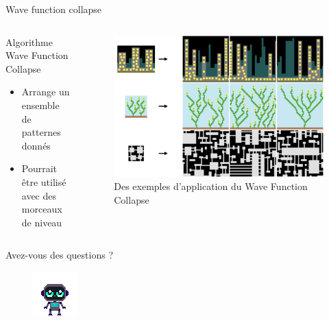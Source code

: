 \documentclass{beamer}
\begin{document}
{\begin{frame}{Wave function collapse}
    \begin{columns}
        \begin{block}{Algorithme Wave Function Collapse}
            \begin{itemize}
                \item[\bullet] Arrange un ensemble de patternes donnés
                \item[\bullet] Pourrait être utilisé avec des morceaux de niveau
            \end{itemize}
        \end{block}
        \begin{figure}
            \centering
            \includegraphics[width=1.0\textwidth]{wfc-examples}
            \caption{Des exemples d'application du Wave Function Collapse}
        \end{figure}
    \end{columns}
\end{frame}

}

\begin{frame}
    \centering
    Avez-vous des questions ?
    \begin{figure}
        \centering
        \includegraphics[width=0.5\linewidth]{character_placeholder}
    \end{figure}
\end{frame}
\end{document}
